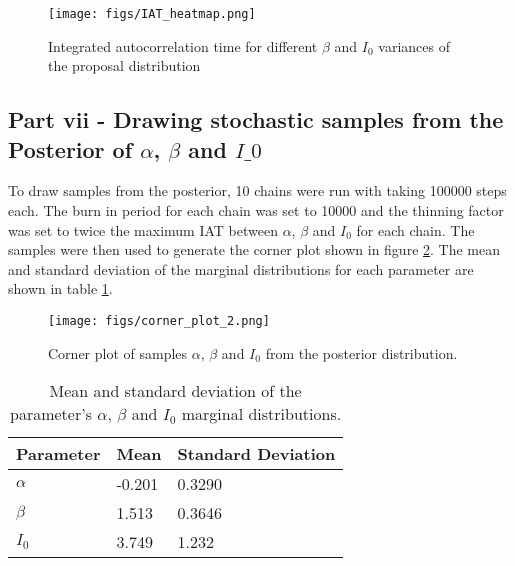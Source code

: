 \documentclass[11pt]{article}
\begin{document}
\begin{figure}[H]
    \centering
    \texttt{[image: figs/IAT\_heatmap.png]}
    \caption{Integrated autocorrelation time for different $\beta$ and $I_0$ variances of the proposal distribution}
    \label{fig:std_tuning_2}
\end{figure}
\subsection{Part vii - Drawing stochastic samples from the Posterior of $\alpha$, $\beta$ and $I\_0$}
To draw samples from the posterior, 10 chains were run with taking 100000 steps each. The burn in period for each chain was set to 10000 and the thinning factor was set to twice the maximum IAT between $\alpha$, $\beta$ and $I_0$ for each chain. The samples were then used to generate the corner plot shown in figure \ref{fig:corner_plot}. The mean and standard deviation of the marginal distributions for each parameter are shown in table \ref{tab:mean_std_2}.

\begin{figure}[H]
    \centering
    \texttt{[image: figs/corner\_plot\_2.png]}
    \caption{Corner plot of samples $\alpha$, $\beta$ and $I_0$ from the posterior distribution.}
    \label{fig:corner_plot}
\end{figure}

\begin{table}[H]
    \centering
    \begin{tabular}{@{}lll@{}}
    \toprule
    Parameter & Mean & Standard Deviation \\ \midrule
    $\alpha$  & -0.201 & 0.3290 \\
    $\beta$   & 1.513 & 0.3646 \\
    $I_0$    & 3.749 & 1.232 \\ \bottomrule
    \end{tabular}
    \caption{Mean and standard deviation of the parameter's $\alpha$, $\beta$ and $I_0$ marginal distributions.}
    \label{tab:mean_std_2}
\end{table}


\end{document}
